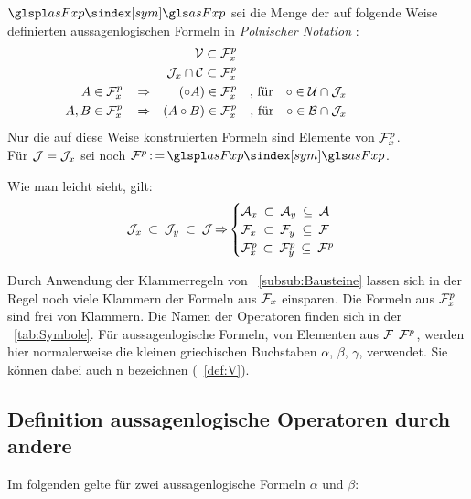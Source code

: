$\glsSym{asFxp}$ sei die Menge der auf folgende Weise definierten aussagenlogischen Formeln in \emph{Polnischer Notation}%
:
\begin{align}
	&                                & \mathcal{V}            \subset \mathcal{F}_x^p
	\\
	&                                & \mathcal{J}_x \cap \mathcal{C} \subset \mathcal{F}_x^p
	\\
	A    \in \mathcal{F}_x^p & \quad \operatorname{\Rightarrow} &  (\circ A)          \in \mathcal{F}_x^p
	& & \text{, für}  \quad \circ \in \mathcal{U} \cap \mathcal{J}_x
	\\
	A, B \in \mathcal{F}_x^p & \quad \operatorname{\Rightarrow} & (A \circ B)         \in \mathcal{F}_x^p
	& & \text{, für}  \quad \circ \in \mathcal{B} \cap \mathcal{J}_x
	&&&&&&&&&&
\end{align}
Nur die auf diese Weise konstruierten Formeln sind Elemente von $\mathcal{F}_x^p$.
\\Für $\mathcal{J} = \mathcal{J}_x$ sei noch $\asFp \defeq \glsSym{asFxp}$.

Wie man leicht sieht, gilt:
\begin{equation}
	\mathcal{J}_x \: \subset \: \mathcal{J}_y \: \subset \: \mathcal{J} \operatorname{\Rightarrow}
	\begin{cases}
		\mathcal{A}_x \: \subset \: \mathcal{A}_y \: \subseteq \: \mathcal{A} \\
		\mathcal{F}_x \; \subset \: \mathcal{F}_y \; \subseteq \: \mathcal{F} \\
		\mathcal{F}_x^p\, \subset \: \mathcal{F}_y^p\, \subseteq \: \mathcal{F}^p
	\end{cases}
\end{equation}

Durch Anwendung der Klammerregeln von \subsubsectionname~\vref{subsub:Bausteine} lassen sich in der Regel noch viele Klammern der Formeln aus $\mathcal{F}_x$ einsparen.
Die Formeln aus $\mathcal{F}_x^p$ sind frei von Klammern.
Die Namen der Operatoren finden sich in der \tablename~\vref{tab:Symbole}.
Für aussagenlogische Formeln, \textdh von Elementen aus $\mathcal{F}$ \textbzw $\mathcal{F}^p$, werden hier normalerweise die kleinen griechischen Buchstaben $\alpha$, $\beta$, $\gamma$, \textusw verwendet.
Sie können dabei auch n bezeichnen (\seename~\eqref{def:V}).

\subsection{Definition aussagenlogische Operatoren durch andere}%
\label{sub:ausOperatorDef}

Im folgenden gelte für zwei aussagenlogische Formeln $\alpha$ und $\beta$:

